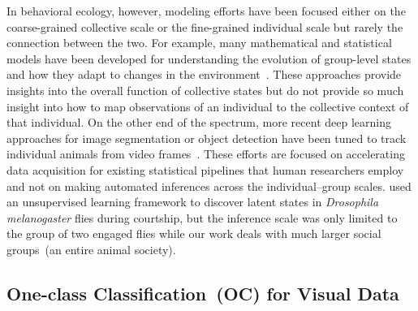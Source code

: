 \documentclass[letterpaper]{article} %
\begin{document}
In behavioral ecology, however, modeling efforts have been focused
either on the coarse-grained collective scale or the fine-grained
individual scale but rarely the connection between the two. For example,
many mathematical and statistical models have been developed for
understanding the evolution of group-level states and how they adapt to
changes in the environment~\citep{CKJRF02, RLPKCG15, SPSHPL16, PMSF02,
BSCHDMS06}. These approaches provide insights into the overall function
of collective states but do not provide so much insight into how to map
observations of an individual to the collective context of that
individual. On the other end of the spectrum, more recent deep learning
approaches for image segmentation or object detection have been tuned to
track individual animals from video frames~\citep{BHMS18, NMCPBM19}.
These efforts are focused on accelerating data acquisition for existing
statistical pipelines that human researchers employ and not on making
automated inferences across the individual--group scales. 
used an unsupervised learning framework to discover latent states in
\emph{Drosophila melanogaster} flies during courtship, but the inference
scale was only limited to the group of two engaged flies while our work
deals with much larger social groups~(an entire animal society).

\subsection{One-class Classification~(OC) for Visual Data}
\label{sec:occ}
\end{document}

